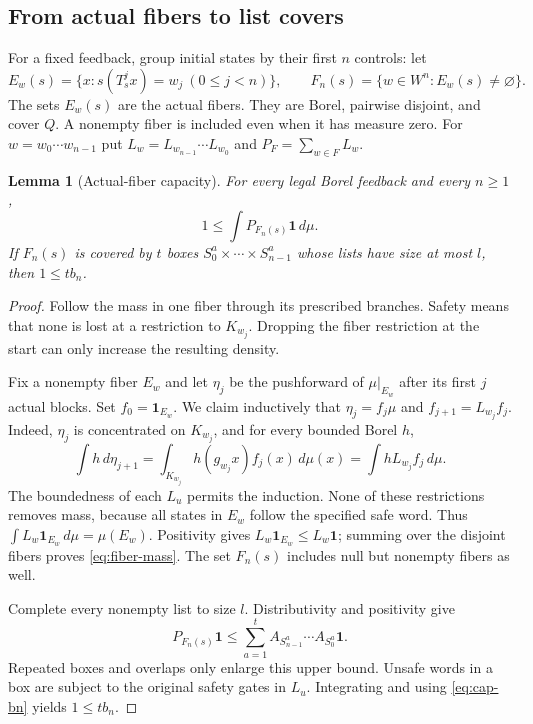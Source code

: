 \documentclass[11pt,reqno]{amsart}
\numberwithin{equation}{section}
\newtheorem{lemma}[theorem]{Lemma}
\theoremstyle{definition}
\theoremstyle{definition}
\newcommand{\one}{\mathbf 1}
\begin{document}
\subsection{From actual fibers to list covers}
For a fixed feedback, group initial states by their first $n$ controls:
let
\[
 E_w(s)=\{x:s(T_s^jx)=w_j\ (0\le j<n)\},\qquad
 F_n(s)=\{w\in W^n:E_w(s)\ne\varnothing\}.
\]
The sets $E_w(s)$ are the actual fibers. They are Borel, pairwise
disjoint, and cover $Q$. A nonempty fiber is included even when it
has measure zero.
For $w=w_0\cdots w_{n-1}$ put
$L_w=L_{w_{n-1}}\cdots L_{w_0}$ and
$P_F=\sum_{w\in F}L_w$.

\begin{lemma}[Actual-fiber capacity]\label{lem:fiber-cap}
For every legal Borel feedback and every $n\ge1$,
\begin{equation}\label{eq:fiber-mass}
 1\le\int P_{F_n(s)}\one\,d\mu.
\end{equation}
If $F_n(s)$ is covered by $t$ boxes
$S^a_0\times\cdots\times S^a_{n-1}$ whose lists have size at
most $l$, then $1\le t b_n$.
\end{lemma}
\begin{proof}
Follow the mass in one fiber through its prescribed branches. Safety
means that none is lost at a restriction to $K_{w_j}$. Dropping the
fiber restriction at the start can only increase the resulting density.

Fix a nonempty fiber $E_w$ and let $\eta_j$ be the pushforward
of $\mu|_{E_w}$ after its first $j$ actual blocks. Set
$f_0=\one_{E_w}$. We claim inductively that
$\eta_j=f_j\mu$ and $f_{j+1}=L_{w_j}f_j$. Indeed,
$\eta_j$ is concentrated on $K_{w_j}$, and for every bounded Borel $h$,
\[
 \int h\,d\eta_{j+1}
 =\int_{K_{w_j}}h(g_{w_j}x)f_j(x)\,d\mu(x)
 =\int hL_{w_j}f_j\,d\mu.
\]
The boundedness of each $L_u$ permits the induction. None of these
restrictions removes mass, because all states in $E_w$ follow the
specified safe word. Thus $\int L_w\one_{E_w}\,d\mu=\mu(E_w)$.
Positivity gives $L_w\one_{E_w}\le L_w\one$; summing over the
disjoint fibers proves \eqref{eq:fiber-mass}. The set $F_n(s)$ includes
null but nonempty fibers as well.

Complete every nonempty list to size $l$. Distributivity and positivity
give
\[
 P_{F_n(s)}\one\le\sum_{a=1}^t
 A_{S^a_{n-1}}\cdots A_{S^a_0}\one.
\]
Repeated boxes and overlaps only enlarge this upper bound. Unsafe
words in a box are subject to the original safety gates in $L_u$.
Integrating and using \eqref{eq:cap-bn} yields $1\le tb_n$.
\end{proof}
\end{document}
